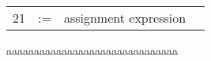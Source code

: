 \documentclass{article}
\begin{document}
\begin{table}[htb]
{\begin{tabular}{c l l l}
21 & :=                                                                                                            & assignment expression                                                                                                                &                                                                                                                                                                                                                                                                                                                                                                                                                                                                                                                                                                                                                               
\end{tabular}
}
\end{table}

\FloatBarrier	%

aaaaaaaaaaaaaaaaaaaaaaaaaaaaaaa







	
\end{document}
